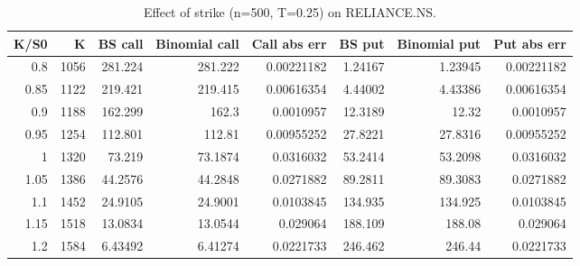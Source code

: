 \begin{table}
\centering
\small
\caption{Effect of strike (n=500, T=0.25) on RELIANCE.NS.}
\label{tab:e3_strike}
\begin{adjustbox}{max width=\textwidth}
\begin{tabular}{rrrrrrrr}
\toprule
K/S0 & K & BS call & Binomial call & Call abs err & BS put & Binomial put & Put abs err \\
\midrule
0.8 & 1056 & 281.224 & 281.222 & 0.00221182 & 1.24167 & 1.23945 & 0.00221182 \\
0.85 & 1122 & 219.421 & 219.415 & 0.00616354 & 4.44002 & 4.43386 & 0.00616354 \\
0.9 & 1188 & 162.299 & 162.3 & 0.0010957 & 12.3189 & 12.32 & 0.0010957 \\
0.95 & 1254 & 112.801 & 112.81 & 0.00955252 & 27.8221 & 27.8316 & 0.00955252 \\
1 & 1320 & 73.219 & 73.1874 & 0.0316032 & 53.2414 & 53.2098 & 0.0316032 \\
1.05 & 1386 & 44.2576 & 44.2848 & 0.0271882 & 89.2811 & 89.3083 & 0.0271882 \\
1.1 & 1452 & 24.9105 & 24.9001 & 0.0103845 & 134.935 & 134.925 & 0.0103845 \\
1.15 & 1518 & 13.0834 & 13.0544 & 0.029064 & 188.109 & 188.08 & 0.029064 \\
1.2 & 1584 & 6.43492 & 6.41274 & 0.0221733 & 246.462 & 246.44 & 0.0221733 \\
\bottomrule
\end{tabular}
\end{adjustbox}
\end{table}
